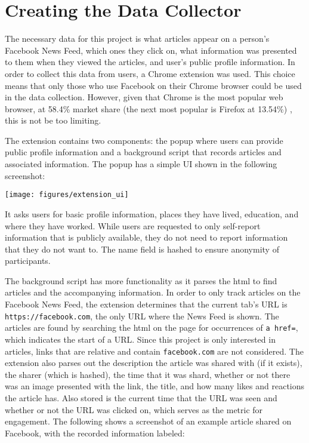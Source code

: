 \section{Creating the Data Collector} \label{ch:collector}
The necessary data for this project is what articles appear on a person's Facebook News Feed, which ones they click on, what information was presented to them when they viewed the articles, and user's public profile information.  In order to collect this data from users, a Chrome extension was used.  This choice means that only those who use Facebook on their Chrome browser could be used in the data collection.  However, given that Chrome is the most popular web browser, at 58.4\% market share (the next most popular is Firefox at 13.54\%) \cite{browsers}, this is not be too limiting.

The extension contains two components: the popup where users can provide public profile information and a background script that records articles and associated information.  The popup has a simple UI shown in the following screenshot:
\begin{center}
	\texttt{[image: figures/extension\_ui]}
\end{center}

It asks users for basic profile information, places they have lived, education, and where they have worked.  While users are requested to only self-report information that is publicly available, they do not need to report information that they do not want to.  The name field is hashed to ensure anonymity of participants.

The background script has more functionality as it parses the html to find articles and the accompanying information.  In order to only track articles on the Facebook News Feed, the extension determines that the current tab's URL is \\ \texttt{https://facebook.com}, the only URL where the News Feed is shown.  The articles are found by searching the html on the page for occurrences of \texttt{a href=}, which indicates the start of a URL.  Since this project is only interested in articles, links that are relative and contain \texttt{facebook.com} are not considered.  The extension also parses out the description the article was shared with (if it exists), the sharer (which is hashed), the time that it was shard, whether or not there was an image presented with the link, the title, and how many likes and reactions the article has.  Also stored is the current time that the URL was seen and whether or not the URL was clicked on, which serves as the metric for engagement.  The following shows a screenshot of an example article shared on Facebook, with the recorded information labeled:

